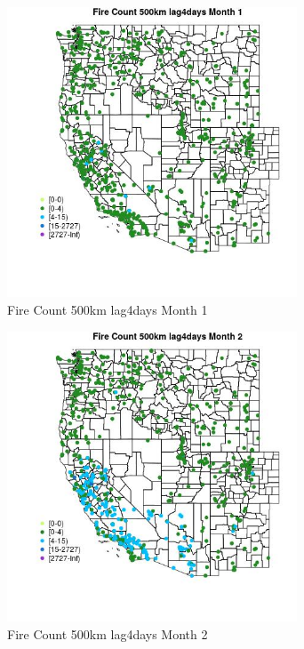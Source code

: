 \begin{figure} 
\centering  
\includegraphics[width=0.77\textwidth]{Code_Outputs/Report_ML_input_PM25_Step4_part_f_de_duplicated_aveswNAs_MapObsMo1Fire_Count_500km_lag4days.jpg} 
\caption{\label{fig:Report_ML_input_PM25_Step4_part_f_de_duplicated_aveswNAsMapObsMo1Fire_Count_500km_lag4days}Fire Count 500km lag4days Month 1} 
\end{figure} 
 

\begin{figure} 
\centering  
\includegraphics[width=0.77\textwidth]{Code_Outputs/Report_ML_input_PM25_Step4_part_f_de_duplicated_aveswNAs_MapObsMo2Fire_Count_500km_lag4days.jpg} 
\caption{\label{fig:Report_ML_input_PM25_Step4_part_f_de_duplicated_aveswNAsMapObsMo2Fire_Count_500km_lag4days}Fire Count 500km lag4days Month 2} 
\end{figure} 
 

